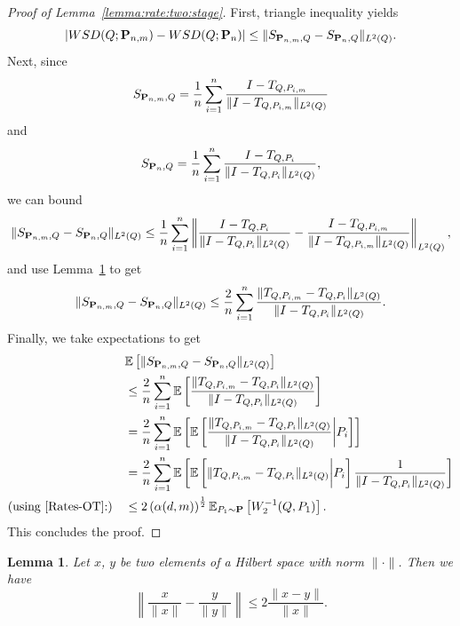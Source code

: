 \documentclass{imsart}
\newtheorem {Lemma}[Proposition] {Lemma}
\numberwithin{equation}{section}
\def\E{\mathbb{E}}
\def\E{\mathbb E}
\begin{document}
\begin{proof}[Proof of Lemma~\ref{lemma:rate:two:stage}]
	First, triangle inequality yields 
	$$ |  {\rm WSD}(Q; {\bf P}_{n,m})- {\rm WSD}(Q; {\bf P}_n)| \leq \| S_{{\bf P}_{n,m},Q}- S_{{\bf P}_{n},Q}\|_{L^ 2(Q)}. $$
	Next, since
	$$  S_{{\bf P}_{n,m},Q}= \frac{1}{n}  \sum_{i=1}^n \frac{I-T_{Q,P_{i,m}} }{\|I-T_{Q,P_{i,m}}\|_{L^2(Q)}}  $$
	and 
	$$  S_{{\bf P}_{n},Q}= \frac{1}{n}  \sum_{i=1}^n \frac{I-T_{Q,P_{i}}  }{\|I-T_{Q,P_{i}}\|_{L^2(Q)}}, $$
	we can bound 
	$$ \| S_{{\bf P}_{n,m},Q}- S_{{\bf P}_{n},Q}\|_{L^ 2(Q)} \leq \frac{1}{n}  \sum_{i=1}^n \left\| \frac{I-T_{Q,P_{i}}  }{\|I-T_{Q,P_{i}}\|_{L^2(Q)}} - \frac{I-T_{Q,P_{i,m}} }{\|I-T_{Q,P_{i,m}}\|_{L^2(Q)}}\right\|_{L^2(Q)}, $$
	and use Lemma~\ref{lem:diff:renormalized} to get 
	$$  \| S_{{\bf P}_{n,m},Q}- S_{{\bf P}_{n},Q}\|_{L^ 2(Q)} \leq \frac{2}{n}  \sum_{i=1}^n  \frac{\|T_{Q,P_{i,m}}-T_{Q,P_{i}}\|_{L^2(Q)}}{\|I-T_{Q,P_{i}}\|_{L^2(Q)}}.   $$
	Finally, we take expectations to get 
	\begin{align*}
		& \E 
		\left[ 
		\| S_{{\bf P}_{n,m},Q}- S_{{\bf P}_{n},Q}\|_{L^ 2(Q)}
		\right]
		\\
		&\leq \frac{2}{n}  \sum_{i=1}^n  \E\left[\frac{\|T_{Q,P_{i,m}}-T_{Q,P_{i}}\|_{L^2(Q)}}{\|I-T_{Q,P_{i}}\|_{L^2(Q)}} \right]\\
		&=\frac{2}{n}  \sum_{i=1}^n  \E\left[\E\left[\frac{\|T_{Q,P_{i,m}}-T_{Q,P_{i}}\|_{L^2(Q)}}{\|I-T_{Q,P_{i}}\|_{L^2(Q)}} \bigg\vert P_i \right] \right]\\
		&=\frac{2}{n}  \sum_{i=1}^n  \E\left[\E\left[ \|T_{Q,P_{i,m}}-T_{Q,P_{i}}\|_{L^2(Q)} \bigg\vert P_i \right] \frac{1}{\|I-T_{Q,P_{i}}\|_{L^2(Q)}} \right]\\
		\mbox{(using \eqref{Rates-OT}:)} 
		~ ~ ~
		&\leq 
		2
		\left( \alpha(d,m)\right)^{\frac{1}{2}} \E_{P_1\sim {\bf P}}\left[ W_2^{-1}(Q,P_{1})\right].
	\end{align*}
	This concludes the proof.
\end{proof}


\begin{Lemma}
	\label{lem:diff:renormalized}
	Let $x$, $y$ be two elements of a Hilbert space with  norm $\| \cdot \|$. Then we have
	\begin{equation} \label{eq:renorm:diff}
		\left\|  
		\frac{x}{\|x\|}
		-
		\frac{y}{\|y\|}
		\right\|
		\le 
		2 
		\frac{\|x-y\|}{\|x\|}.
	\end{equation}
\end{Lemma} 
\end{document}

